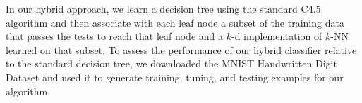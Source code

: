 In our hybrid approach, we learn a decision tree using the standard C4.5 algorithm and then associate with each leaf node a subset of the training data that passes the tests to reach that leaf node and a $k$-d implementation of $k$-NN learned on that subset. To assess the performance of our hybrid classifier relative to the standard decision tree, we downloaded the MNIST Handwritten Digit Dataset \cite{MNISTDatabase} and used it to generate training, tuning, and testing examples for our algorithm.
